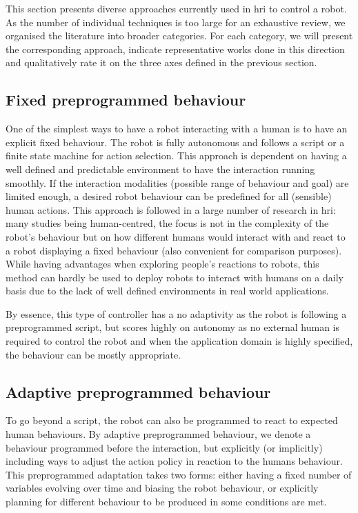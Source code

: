     This section presents diverse approaches currently used in \gls{hri} to control a robot. As the number of individual techniques is too large for an exhaustive review, we organised the literature into broader categories. For each category, we will present the corresponding approach, indicate representative works done in this direction and qualitatively rate it on the three axes defined in the previous section.
	
\subsection{Fixed preprogrammed behaviour}

    One of the simplest ways to have a robot interacting with a human is to have an explicit fixed behaviour. The robot is fully autonomous and follows a script or a finite state machine for action selection. This approach is dependent on having a well defined and predictable environment to have the interaction running smoothly. If the interaction modalities (possible range of behaviour and goal) are limited enough, a desired robot behaviour can be predefined for all (sensible) human actions. This approach is followed in a large number of research in \gls{hri}: many studies being human-centred, the focus is not in the complexity of the robot's behaviour but on how different humans would interact with and react to a robot displaying a fixed behaviour (also convenient for comparison purposes). While having advantages when exploring people's reactions to robots, this method can hardly be used to deploy robots to interact with humans on a daily basis due to the lack of well defined environments in real world applications.

    By essence, this type of controller has a no adaptivity as the robot is following a preprogrammed script, but scores highly on autonomy as no external human is required to control the robot and when the application domain is highly specified, the behaviour can be mostly appropriate.

\subsection{Adaptive preprogrammed behaviour}
	
	To go beyond a script, the robot can also be programmed to react to expected human behaviours. By adaptive preprogrammed behaviour, we denote a behaviour programmed before the interaction, but explicitly (or implicitly) including ways to adjust the action policy in reaction to the humans behaviour. This preprogrammed adaptation takes two forms: either having a fixed number of variables evolving over time and biasing the robot behaviour, or explicitly planning for different behaviour to be produced in some conditions are met.
	
